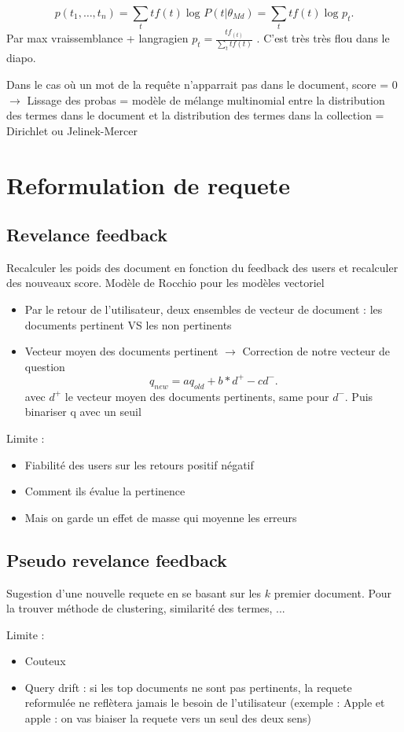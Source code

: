 \documentclass{article}
\begin{document}
\begin{multicols}{2}
\[
    p(t_1, \dots, t_n) = \sum_{t}^{}tf(t)\log_{} P(t | \theta _{Md}) = \sum_{t}^{}tf(t)\log_{} p_t
.\]
Par max vraissemblance + langragien  $ p_t = \frac{tf_(t)}{\sum_{t}^{}tf(t)} $ . C'est très très flou dans le diapo.

Dans le cas où un mot de la requête n'apparrait pas dans le document, score = 0 $\rightarrow$ Lissage des probas = modèle de
mélange multinomial entre la distribution des termes dans le
document et la distribution des termes dans la collection = Dirichlet ou Jelinek-Mercer

\section{Reformulation de requete}
\subsection{Revelance feedback}
Recalculer les poids des document en fonction du feedback des users et recalculer des nouveaux score. Modèle de Rocchio pour les modèles vectoriel \begin{itemize}
    \item Par le retour de l'utilisateur, deux ensembles de vecteur de document : les documents pertinent VS les non pertinents
    \item Vecteur moyen des documents pertinent $\rightarrow$ Correction de notre vecteur de question 
    \[
        q_{new} = a q_{old} + b * d^+ - c d^-
    .\]
    avec $ d^+ $ le vecteur moyen des documents pertinents, same pour $ d^- $. Puis binariser q avec un seuil
\end{itemize}
Limite : 
\begin{itemize}
    \item Fiabilité des users sur les retours positif négatif 
    \item Comment ils évalue la pertinence
    \item Mais on garde un effet de masse qui moyenne les erreurs 
\end{itemize}

\subsection{Pseudo revelance feedback}
Sugestion d'une nouvelle requete en se basant sur les $ k $ premier document. Pour la trouver méthode de clustering, similarité des termes, ...

Limite : 
\begin{itemize}
    \item Couteux
    \item Query drift : si les top documents ne sont pas pertinents, la requete reformulée ne reflètera jamais le besoin de l'utilisateur (exemple : Apple et apple :  on vas biaiser la requete vers un seul des deux sens)
\end{itemize}


\end{multicols}
\end{document}
